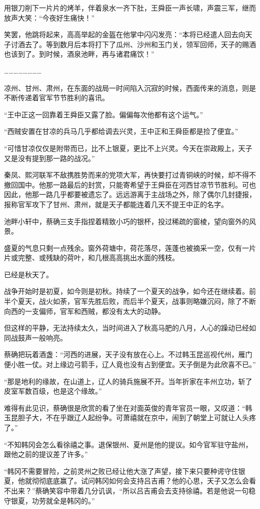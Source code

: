 用银刀削下一片片的烤羊，伴着泉水一齐下肚，王舜臣一声长啸，声震三军，继而放声大笑：“今夜好生痛快！”

笑罢，他跳将起来，高高举起的金盔在他掌中闪闪发亮：“本将已经遣人回去向天子讨酒去了。等到数月后本将打下了瓜州、沙州和玉门关，领军回师，天子的赐酒也该到了。到时候，酒泉池畔，再与诸君痛饮！”

……………………

凉州、甘州、肃州，在东面的战局一时间陷入沉寂的时候，西面传来的消息，则是不断传递着官军节节胜利的喜讯。

“王中正这一回靠着王舜臣又露了脸。偏偏每次他都有这个运气。”

“西贼安置在甘凉的兵马几乎都给调去兴灵，王中正和王舜臣都是捡了便宜。”

“可惜甘凉仅仅是附带而已，比不上银夏，更比不上兴灵。今天在崇政殿上，天子又是没有提到那一路的战况。”

秦凤、熙河联军不敌携胜势而来的党项大军，再快要打过青铜峡的时候，却不得不撤回国中。他那一路最后的封赏，只能寄希望于王舜臣在河西甘凉节节胜利。可也因此，他那一路几乎都要被遗忘了。远远游离于主战场之外，除了偶尔几封捷报，报称官军攻下了甘州、肃州，就是天子都能连着几天不提王中正的名字。

池畔小轩中，蔡确三支手指捏着精致小巧的银杯，投过稀疏的窗棱，望向窗外的风景。

盛夏的气息只剩一点残余。窗外荷塘中，荷花落尽，莲蓬也被摘采一空，仅有一片片或完整、或残缺的荷叶，和几根高高挑出水面的残枝。

已经是秋天了。

战争开始时是初夏，如今则是初秋。持续了一个夏天的战争，如今还在继续着。前半个夏天，战火如荼，官军先胜后败，而后半个夏天，战事则略嫌沉闷，除了不断向西的一支偏师，官军和西贼，都没有太大的动静。

但这样的平静，无法持续太久，当时间进入了秋高马肥的八月，人心的躁动已经如同战鼓声一般响亮。

蔡确把玩着酒盏：“河西的进展，天子没有放在心上。不过韩玉昆巡视代州，雁门便小胜一仗。对上缘边弓箭手，辽人竟也没有占到便宜。天子倒是为此欣喜不已。”

“那是地利的缘故，在山道上，辽人的骑兵施展不开。当年折家在丰州立功，斩了皮室军数百级，也是这个缘故。”

难得有此见识，蔡确很是欣赏的看了坐在对面英俊的青年官员一眼，又叹道：“韩玉昆胆子大，不在乎跟辽人起纷争。可萧禧就在京中，闹到了朝堂上可就让人头疼了。”

“不知韩冈会怎么看徐禧之事。退保银州、夏州是他的提议。如今官军驻守盐州，跟他之前的提议差了许多。”

“韩冈不需要冒险，之前灵州之败已经让他大涨了声望，接下来只要种谔守住银夏，他就彻彻底底赢了。试问韩冈如何会支持吕吉甫？他的心思，天子又怎么会看不出来？”蔡确笑容中带着几分讥讽，“所以吕吉甫会去支持徐禧。若是他说一句稳守银夏，功劳就全是韩冈的。”

